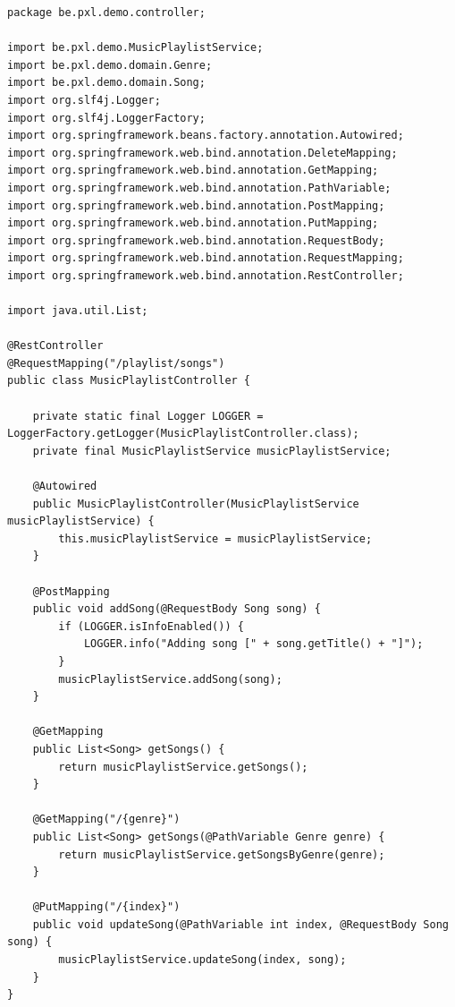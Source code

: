 \begin{lstlisting}
package be.pxl.demo.controller;

import be.pxl.demo.MusicPlaylistService;
import be.pxl.demo.domain.Genre;
import be.pxl.demo.domain.Song;
import org.slf4j.Logger;
import org.slf4j.LoggerFactory;
import org.springframework.beans.factory.annotation.Autowired;
import org.springframework.web.bind.annotation.DeleteMapping;
import org.springframework.web.bind.annotation.GetMapping;
import org.springframework.web.bind.annotation.PathVariable;
import org.springframework.web.bind.annotation.PostMapping;
import org.springframework.web.bind.annotation.PutMapping;
import org.springframework.web.bind.annotation.RequestBody;
import org.springframework.web.bind.annotation.RequestMapping;
import org.springframework.web.bind.annotation.RestController;

import java.util.List;

@RestController
@RequestMapping("/playlist/songs")
public class MusicPlaylistController {

	private static final Logger LOGGER = LoggerFactory.getLogger(MusicPlaylistController.class);
	private final MusicPlaylistService musicPlaylistService;

	@Autowired
	public MusicPlaylistController(MusicPlaylistService musicPlaylistService) {
		this.musicPlaylistService = musicPlaylistService;
	}

	@PostMapping
	public void addSong(@RequestBody Song song) {
		if (LOGGER.isInfoEnabled()) {
			LOGGER.info("Adding song [" + song.getTitle() + "]");
		}
		musicPlaylistService.addSong(song);
	}

	@GetMapping
	public List<Song> getSongs() {
		return musicPlaylistService.getSongs();
	}

	@GetMapping("/{genre}")
	public List<Song> getSongs(@PathVariable Genre genre) {
		return musicPlaylistService.getSongsByGenre(genre);
	}

	@PutMapping("/{index}")
	public void updateSong(@PathVariable int index, @RequestBody Song song) {
		musicPlaylistService.updateSong(index, song);
	}
}
\end{lstlisting}


